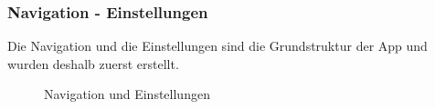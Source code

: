 \subsubsection{Navigation - Einstellungen}\label{mockup_navigation_settings}
Die Navigation und die Einstellungen sind die Grundstruktur der App und wurden deshalb zuerst erstellt.
\begin{figure}[ht]
\centering
{}
\label{fig:mockup_setting}
\caption{Navigation und Einstellungen}
\end{figure}

